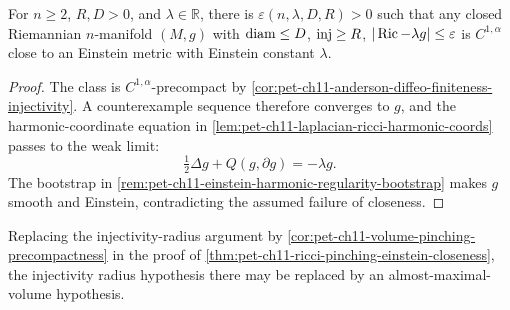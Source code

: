 \begin{theorem}
  \label{thm:pet-ch11-ricci-pinching-einstein-closeness}

  For $n\ge2$, $R,D>0$, and $\lambda\in\mathbb{R}$, there is
  $\varepsilon(n,\lambda,D,R)>0$ such that any closed Riemannian $n$-manifold
  $(M,g)$ with $\operatorname{diam}\le D$, $\operatorname{inj}\ge R$, $|\operatorname{Ric}-\lambda g|\le\varepsilon$ is
  $C^{1,\alpha}$ close to an Einstein metric with Einstein constant $\lambda$.
\end{theorem}
\begin{proof}
  \sketch
  The class is \(C^{1,\alpha}\)-precompact by \cref{cor:pet-ch11-anderson-diffeo-finiteness-injectivity}. A counterexample sequence therefore converges to \(g\), and the harmonic-coordinate equation in \cref{lem:pet-ch11-laplacian-ricci-harmonic-coords} passes to the weak limit:
  \[
    \tfrac12\Delta g+Q(g,\partial g)=-\lambda g.
  \]
  The bootstrap in \cref{rem:pet-ch11-einstein-harmonic-regularity-bootstrap} makes \(g\) smooth and Einstein, contradicting the assumed failure of closeness.
\end{proof}


\begin{remark}
  \label{rem:pet-ch11-ricci-pinching-volume-alternative}

  Replacing the injectivity-radius argument by
  \cref{cor:pet-ch11-volume-pinching-precompactness} in the
  proof of
  \cref{thm:pet-ch11-ricci-pinching-einstein-closeness}, the injectivity
  radius hypothesis there may be replaced by an almost-maximal-volume
  hypothesis.
\end{remark}

